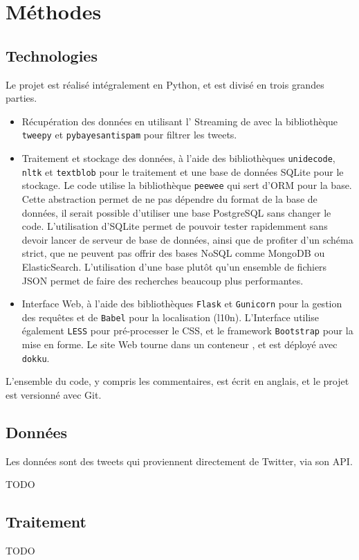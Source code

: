 
\section{Méthodes}

\subsection{Technologies}

Le projet est réalisé intégralement en Python, et est divisé en trois grandes
parties.

\begin{itemize}
  \item Récupération des données en utilisant l’\api{} Streaming de \twt{} avec
    la bibliothèque \verb|tweepy| et \verb|pybayesantispam| pour filtrer les
    tweets.
  \item Traitement et stockage des données, à l’aide des bibliothèques
    \verb|unidecode|, \verb|nltk| et \verb|textblob| pour le traitement et une
    base de données SQLite pour le stockage. Le code utilise la bibliothèque
    \verb|peewee| qui sert d’ORM pour la base. Cette abstraction permet de ne
    pas dépendre du format de la base de données, il serait possible d’utiliser
    une base PostgreSQL sans changer le code. L’utilisation d’SQLite permet de
    pouvoir tester rapidemment sans devoir lancer de serveur de base de
    données, ainsi que de profiter d’un schéma strict, que ne peuvent pas
    offrir des bases NoSQL comme MongoDB ou ElasticSearch. L’utilisation d’une
    base plutôt qu’un ensemble de fichiers JSON permet de faire des recherches
    beaucoup plus performantes.
  \item Interface Web, à l’aide des bibliothèques \verb|Flask| et
    \verb|Gunicorn| pour la gestion des requêtes et de \verb|Babel| pour la
    localisation (l10n). L’Interface utilise également \verb|LESS| pour
    pré-processer le CSS, et le framework \verb|Bootstrap| pour la mise en
    forme. Le site Web tourne dans un conteneur , et est déployé avec
    \verb|dokku|.
\end{itemize}

L’ensemble du code, y compris les commentaires, est écrit en anglais, et le
projet est versionné avec Git.

\subsection{Données}

Les données sont des tweets qui proviennent directement de Twitter, via son
API.

TODO

\subsection{Traitement}

TODO
